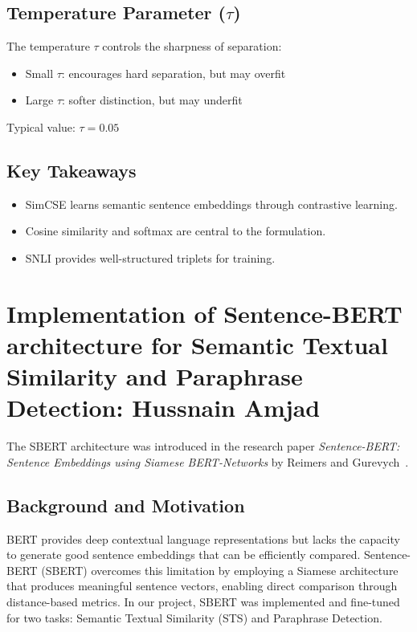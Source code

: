 

\subsection{Temperature Parameter (\texorpdfstring{$\tau$}{τ})}

The temperature $\tau$ controls the sharpness of separation:
\begin{itemize}
    \item Small $\tau$: encourages hard separation, but may overfit
    \item Large $\tau$: softer distinction, but may underfit
\end{itemize}

Typical value: $\tau = 0.05$

\subsection{Key Takeaways}

\begin{itemize}
    \item SimCSE learns semantic sentence embeddings through contrastive learning.
    \item Cosine similarity and softmax are central to the formulation.
    \item SNLI provides well-structured triplets for training.
\end{itemize}
\section{Implementation of Sentence-BERT architecture for Semantic Textual Similarity and Paraphrase Detection: Hussnain Amjad}
The SBERT architecture was introduced in the research paper \textit{Sentence-BERT: Sentence Embeddings using Siamese BERT-Networks} by Reimers and Gurevych~\cite{reimers2019sentence}.

\subsection{Background and Motivation}
BERT provides deep contextual language representations but lacks the capacity to generate good sentence embeddings that can be efficiently compared. Sentence-BERT (SBERT) overcomes this limitation by employing a Siamese architecture that produces meaningful sentence vectors, enabling direct comparison through distance-based metrics. In our project, SBERT was implemented and fine-tuned for two tasks: Semantic Textual Similarity (STS) and Paraphrase Detection.

